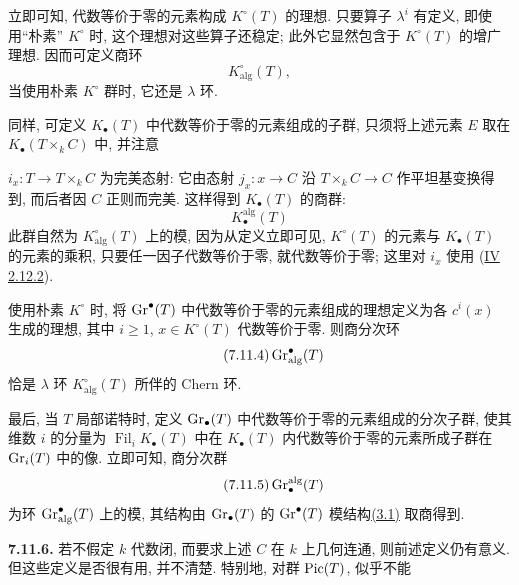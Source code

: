 立即可知, 代数等价于零的元素构成 $K^\circ(T)$ 的理想. 只要算子 $\lambda^i$ 有定义, 即使用“朴素” $K^\circ$ 时, 这个理想对这些算子还稳定; 此外它显然包含于 $K^\circ(T)$ 的增广理想. 因而可定义商环
%
%
%
%
%
\begin{equation}\tag{7.11.2}
K^\circ_{\mathrm{alg}}(T),
\end{equation}
当使用朴素 $K^\circ$ 群时, 它还是 $\lambda$ 环.

同样, 可定义 $K_\bullet(T)$ 中代数等价于零的元素组成的子群, 只须将上述元素 $E$ 取在 $K_\bullet(T\times_k C)$ 中, 并注意
%
%

$i_x:T\to T\times_k C$ 为完美态射: 它由态射 $j_x:x\to C$ 沿 $T\times_k C\to C$ 作平坦基变换得到, 而后者因 $C$ 正则而完美. 这样得到 $K_\bullet(T)$ 的商群:
%
%
\begin{equation}\tag{7.11.3}
K_\bullet^{\mathrm{alg}}(T)
\end{equation}
此群自然为 $K^\circ_{\mathrm{alg}}(T)$ 上的模, 因为从定义立即可见, $K^\circ(T)$ 的元素与 $K_\bullet(T)$ 的元素的乘积, 只要任一因子代数等价于零, 就代数等价于零; 这里对 $i_x$ 使用 (\hyperlink{sga6.e04.eq.2-12-2}{IV 2.12.2}).
%
%
%
%

使用朴素 $K^\circ$ 时, 将 $\operatorname{Gr}^\bullet(T)$ 中代数等价于零的元素组成的理想定义为各 $c^i(x)$ 生成的理想, 其中 $i\geq1$, $x\in K^\circ(T)$ 代数等价于零. 则商分次环
%
%
%
\begin{equation}\tag{7.11.4}
\operatorname{Gr}^\bullet_{\mathrm{alg}}(T)
\end{equation}
恰是 $\lambda$ 环 $K^\circ_{\mathrm{alg}}(T)$ 所伴的 Chern 环.
%

最后, 当 $T$ 局部诺特时, 定义 $\operatorname{Gr}_\bullet(T)$ 中代数等价于零的元素组成的分次子群, 使其维数 $i$ 的分量为 $\operatorname{Fil}_iK_\bullet(T)$ 中在 $K_\bullet(T)$ 内代数等价于零的元素所成子群在 $\operatorname{Gr}_i(T)$ 中的像. 立即可知, 商分次群
%
%
%
%
%
\begin{equation}\tag{7.11.5}
\operatorname{Gr}_\bullet^{\mathrm{alg}}(T)
\end{equation}
为环 $\operatorname{Gr}^\bullet_{\mathrm{alg}}(T)$ 上的模, 其结构由 $\operatorname{Gr}_\bullet(T)$ 的 $\operatorname{Gr}^\bullet(T)$ 模结构\hyperlink{sga6.e10.sec.3.1}{(3.1)} 取商得到.
%
%

\textbf{7.11.6.} 若不假定 $k$ 代数闭, 而要求上述 $C$ 在 $k$ 上几何连通, 则前述定义仍有意义. 但这些定义是否很有用, 并不清楚. 特别地, 对群 $\operatorname{Pic}(T)$, 似乎不能
%
%
%
%
%

